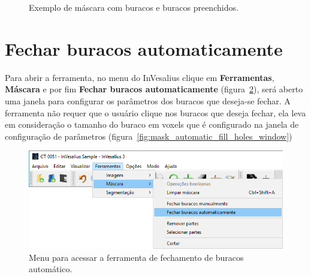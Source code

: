 \begin{figure}[!htb]
  \centering
    \qquad
  \hfill
  \caption{Exemplo de máscara com buracos e buracos preenchidos.}
  \label{fig:mask_fill_hole}
\end{figure}


\section{Fechar buracos automaticamente}

Para abrir a ferramenta, no menu do InVesalius clique em \textbf{Ferramentas}, \textbf{Máscara} e por fim \textbf{Fechar buracos automaticamente} (figura~\ref{fig:menu_mask_automatic_fill_holes}), será aberto uma janela para configurar os parâmetros dos buracos que deseja-se fechar. A ferramenta não requer que o usuário clique nos buracos que deseja fechar, ela leva em consideração o tamanho do buraco em voxels que é configurado na janela de configuração de parâmetros (figura~\ref{fig:mask_automatic_fill_holes_window})

\begin{figure}[!htb]
\centering
\includegraphics[scale=0.4]{../user_guide_figures/invesalius_screen/menu_mask_automatic_fill_holes_pt.png}
\caption{Menu para acessar a ferramenta de fechamento de buracos automático.}
\label{fig:menu_mask_automatic_fill_holes}
\end{figure}

